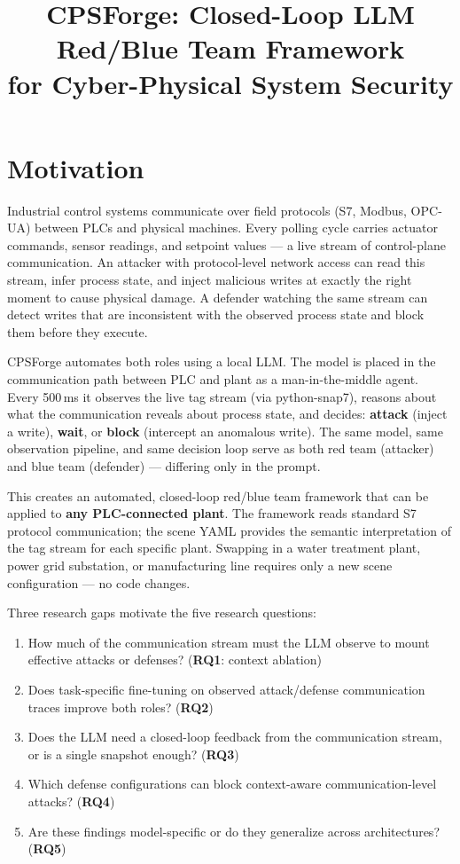 \documentclass[11pt]{article}
\title{\textbf{CPSForge: Closed-Loop LLM Red/Blue Team Framework\\for Cyber-Physical System Security}}
\author{}
\date{}
\begin{document}
\maketitle


\section*{Motivation}

Industrial control systems communicate over field protocols (S7, Modbus, OPC-UA) between PLCs and physical machines. Every polling cycle carries actuator commands, sensor readings, and setpoint values --- a live stream of control-plane communication. An attacker with protocol-level network access can read this stream, infer process state, and inject malicious writes at exactly the right moment to cause physical damage. A defender watching the same stream can detect writes that are inconsistent with the observed process state and block them before they execute.

CPSForge automates both roles using a local LLM. The model is placed in the communication path between PLC and plant as a man-in-the-middle agent. Every 500\,ms it observes the live tag stream (via python-snap7), reasons about what the communication reveals about process state, and decides: \textbf{attack} (inject a write), \textbf{wait}, or \textbf{block} (intercept an anomalous write). The same model, same observation pipeline, and same decision loop serve as both red team (attacker) and blue team (defender) --- differing only in the prompt.

This creates an automated, closed-loop red/blue team framework that can be applied to \textbf{any PLC-connected plant}. The framework reads standard S7 protocol communication; the scene YAML provides the semantic interpretation of the tag stream for each specific plant. Swapping in a water treatment plant, power grid substation, or manufacturing line requires only a new scene configuration --- no code changes.

Three research gaps motivate the five research questions:
\begin{enumerate}[leftmargin=1.5em,nosep]
    \item How much of the communication stream must the LLM observe to mount effective attacks or defenses? (\textbf{RQ1}: context ablation)
    \item Does task-specific fine-tuning on observed attack/defense communication traces improve both roles? (\textbf{RQ2})
    \item Does the LLM need a closed-loop feedback from the communication stream, or is a single snapshot enough? (\textbf{RQ3})
    \item Which defense configurations can block context-aware communication-level attacks? (\textbf{RQ4})
    \item Are these findings model-specific or do they generalize across architectures? (\textbf{RQ5})
\end{enumerate}
\end{document}
